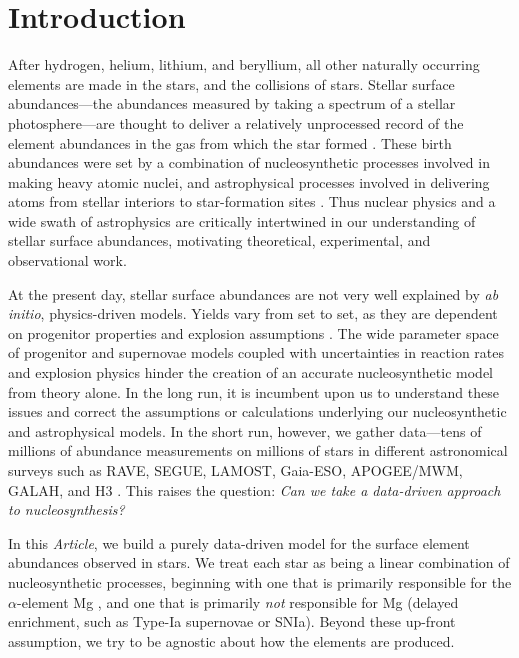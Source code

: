\documentclass[modern]{aastex631}
\newcommand{\documentname}{\textsl{Article}}
\begin{document}
 
\section{Introduction}\label{sec:intro}

After hydrogen, helium, lithium, and beryllium, all other naturally occurring elements are made in the stars, and the collisions of stars.
Stellar surface abundances---the abundances measured by taking a spectrum of a stellar photosphere---are thought to deliver a relatively unprocessed record of the element abundances in the gas from which the star formed \citep[though see e.g.,][]{pinsonneault2001, oh2018, souto2019, vincenzo2021b}.
These birth abundances were set by a combination of nucleosynthetic processes involved in making heavy atomic nuclei, and astrophysical processes involved in delivering atoms from stellar interiors to star-formation sites \citep[e.g.,][]{johnsonja2020}.
Thus nuclear physics and a wide swath of astrophysics are critically intertwined in our understanding of stellar surface abundances, motivating theoretical, experimental, and observational work.

At the present day, stellar surface abundances are not very well explained by \textsl{ab initio}, physics-driven models.
Yields vary from set to set, as they are dependent on progenitor properties and explosion assumptions \citep[e.g.,][]{rybizki2017, griffith2021b}. 
The wide parameter space of progenitor and supernovae models coupled with uncertainties in reaction rates and explosion physics hinder the creation of an accurate nucleosynthetic model from theory alone.
In the long run, it is incumbent upon us to understand these issues and correct the assumptions or calculations underlying our nucleosynthetic and astrophysical models.
In the short run, however, we gather data---tens of millions of abundance measurements on millions of stars in different astronomical surveys such as RAVE, SEGUE, LAMOST, Gaia-ESO, APOGEE/MWM, GALAH, and H3 \citep{steinmetz2006, yanny2009, gilmore2012, desilva2015, luo2015, majewski2017, conroy2019}.
This raises the question: \emph{Can we take a data-driven approach to nucleosynthesis?}

In this \documentname{}, we build a purely data-driven model for the surface element abundances observed in stars.
We treat each star as being a linear combination of nucleosynthetic processes, beginning with one that is primarily responsible for the $\alpha$-element Mg \citep[prompt enrichment, such as core collapse supernovae or CCSN, e.g.,][]{andrews2017}, and one that is primarily \emph{not} responsible for Mg (delayed enrichment, such as Type-Ia supernovae or SNIa).
Beyond these up-front assumption, we try to be agnostic about how the elements are produced.
\end{document}
